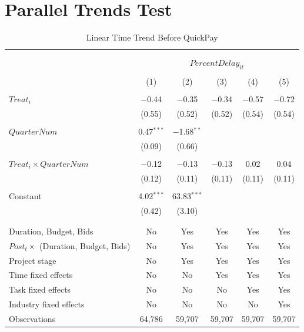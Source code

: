 \documentclass[
]{article}
\begin{document}
\hypertarget{parallel-trends-test}{%
\section{Parallel Trends Test}\label{parallel-trends-test}}

\begin{table}[H] \centering 
  \caption{Linear Time Trend Before QuickPay} 
  \label{} 
\small 
\begin{tabular}{@{\extracolsep{-2pt}}lccccc} 
\\[-1.8ex]\hline 
\hline \\[-1.8ex] 
\\[-1.8ex] & \multicolumn{5}{c}{$PercentDelay_{it}$} \\ 
\\[-1.8ex] & (1) & (2) & (3) & (4) & (5)\\ 
\hline \\[-1.8ex] 
 $Treat_i$ & $-$0.44 & $-$0.35 & $-$0.34 & $-$0.57 & $-$0.72 \\ 
  & (0.55) & (0.52) & (0.52) & (0.54) & (0.54) \\ 
  & & & & & \\ 
 $QuarterNum$ & 0.47$^{***}$ & $-$1.68$^{**}$ &  &  &  \\ 
  & (0.09) & (0.66) &  &  &  \\ 
  & & & & & \\ 
 $Treat_i \times QuarterNum$ & $-$0.12 & $-$0.13 & $-$0.13 & 0.02 & 0.04 \\ 
  & (0.12) & (0.11) & (0.11) & (0.11) & (0.11) \\ 
  & & & & & \\ 
 Constant & 4.02$^{***}$ & 63.83$^{***}$ &  &  &  \\ 
  & (0.42) & (3.10) &  &  &  \\ 
  & & & & & \\ 
\hline \\[-1.8ex] 
Duration, Budget, Bids & No & Yes & Yes & Yes & Yes \\ 
$Post_t \times$  (Duration, Budget, Bids) & No & Yes & Yes & Yes & Yes \\ 
Project stage & No & Yes & Yes & Yes & Yes \\ 
Time fixed effects & No & No & Yes & Yes & Yes \\ 
Task fixed effects & No & No & No & Yes & Yes \\ 
Industry fixed effects & No & No & No & No & Yes \\ 
Observations & 64,786 & 59,707 & 59,707 & 59,707 & 59,707 \\ 

\end{tabular}
\end{table}
\end{document}
